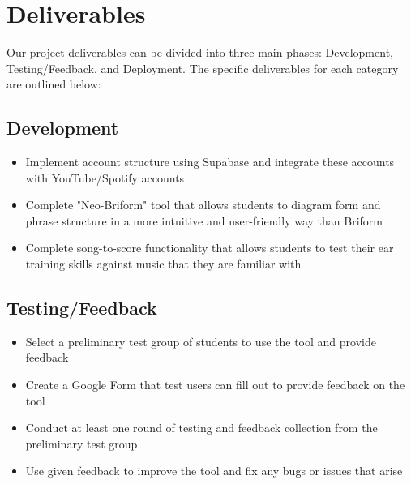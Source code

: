 \documentclass[12pt, letterpaper]{article}
\begin{document}
\pagestyle{empty}

\tableofcontents
\listoftables
\newpage


\section*{Deliverables}
Our project deliverables can be divided into three main phases: Development, Testing/Feedback, and Deployment.  The specific deliverables for each category are outlined below:

\subsection*{Development}
\begin{itemize}
    \item[--] Implement account structure using Supabase and integrate these accounts with YouTube/Spotify accounts
    \item[--] Complete "Neo-Briform" tool that allows students to diagram form and phrase structure in a more intuitive and user-friendly way than Briform
    \item[--] Complete song-to-score functionality that allows students to test their ear training skills against music that they are familiar with
\end{itemize}

\subsection*{Testing/Feedback}
\begin{itemize}
    \item[--] Select a preliminary test group of students to use the tool and provide feedback
    \item[--] Create a Google Form that test users can fill out to provide feedback on the tool
    \item[--] Conduct at least one round of testing and feedback collection from the preliminary test group
    \item[--] Use given feedback to improve the tool and fix any bugs or issues that arise
\end{itemize}
\end{document}
